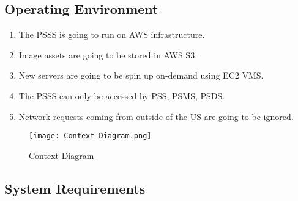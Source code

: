 \subsection{Operating Environment}
\begin{enumerate}[label=OE-\arabic*]
    \item The PSSS is going to run on AWS infrastructure.
    \item Image assets are going to be stored in AWS S3.
    \item New servers are going to be spin up on-demand using EC2 VMS.
    \item The PSSS can only be accessed by PSS, PSMS, PSDS.
    \item Network requests coming from outside of the US are going to be 
    ignored.
\end{enumerate}
\begin{figure}[!htb]
    \centering
    \texttt{[image: Context Diagram.png]}
    \caption{Context Diagram}
\end{figure}
\pagebreak
\subsection{System Requirements}

